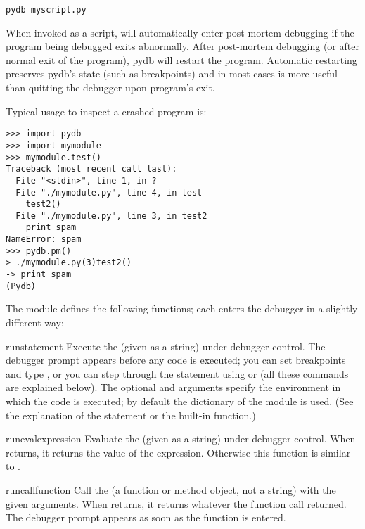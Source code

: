 \begin{verbatim}
pydb myscript.py
\end{verbatim}

When invoked as a script,  will automatically enter
post-mortem debugging if the program being debugged exits
abnormally. After post-mortem debugging (or after normal exit of the
program), pydb will restart the program.  Automatic restarting
preserves pydb's state (such as breakpoints) and in most cases is more
useful than quitting the debugger upon program's exit.

Typical usage to inspect a crashed program is:

\begin{verbatim}
>>> import pydb
>>> import mymodule
>>> mymodule.test()
Traceback (most recent call last):
  File "<stdin>", line 1, in ?
  File "./mymodule.py", line 4, in test
    test2()
  File "./mymodule.py", line 3, in test2
    print spam
NameError: spam
>>> pydb.pm()
> ./mymodule.py(3)test2()
-> print spam
(Pydb) 
\end{verbatim}

The module defines the following functions; each enters the debugger
in a slightly different way:

\begin{funcdesc}{run}{statement}
Execute the  (given as a string) under debugger
control.  The debugger prompt appears before any code is executed; you
can set breakpoints and type , or you can step through
the statement using  or  (all these commands are
explained below).  The optional  and 
arguments specify the environment in which the code is executed; by
default the dictionary of the module  is
used.  (See the explanation of the  statement or the
 built-in function.)
\end{funcdesc}

\begin{funcdesc}{runeval}{expression}
Evaluate the  (given as a string) under debugger
control.  When  returns, it returns the value of the
expression.  Otherwise this function is similar to
.
\end{funcdesc}

\begin{funcdesc}{runcall}{function}
Call the  (a function or method object, not a string)
with the given arguments.  When  returns, it returns
whatever the function call returned.  The debugger prompt appears as
soon as the function is entered.
\end{funcdesc}

